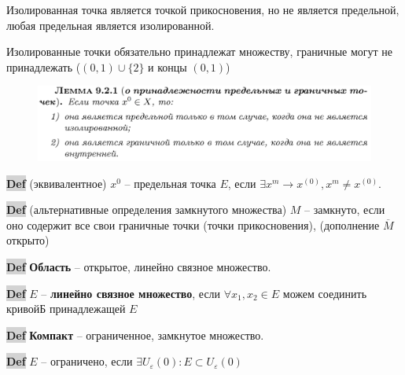 \documentclass{article}
\newcommand{\bb}{\textbf}
\begin{document}
Изолированная точка является точкой прикосновения, но не является предельной, любая предельная является изолированной.

Изолированные точки обязательно принадлежат множеству, граничные могут не принадлежать ($(0,1)\cup \{2\}$ и концы $(0,1)$)
\begin{figure}[h!]
    \centering
    \includegraphics[width=\textwidth]{8.png}
    \vspace{-1cm}
\end{figure}

{\bfseries\colorbox{lightgray}{Def}} (эквивалентное) $x^{0}$ -- предельная точка $E$, если $\exists x^{m} \to x^{(0)}, x^{m}\neq x^{(0)}$.

\newpage

\begin{figure}[h!]
    \centering
\end{figure}

{\bfseries\colorbox{lightgray}{Def}} (альтернативные определения замкнутого множества) $M$ -- замкнуто, если оно содержит все свои граничные точки (точки прикосновения), (дополнение $\overline{M}$ открыто)

{\bfseries\colorbox{lightgray}{Def}} \bb{Область} -- открытое, линейно связное множество.

{\bfseries\colorbox{lightgray}{Def}} $E$ -- \bb{линейно связное множество}, если $\forall x_1, x_2 \in E$ можем соединить кривойБ принадлежащей $E$

{\bfseries\colorbox{lightgray}{Def}} \bb{Компакт} -- ограниченное, замкнутое множество.

{\bfseries\colorbox{lightgray}{Def}} $E$ -- ограничено, если $\exists U_\varepsilon(0) : E\subset U_\varepsilon(0)$
\end{document}
